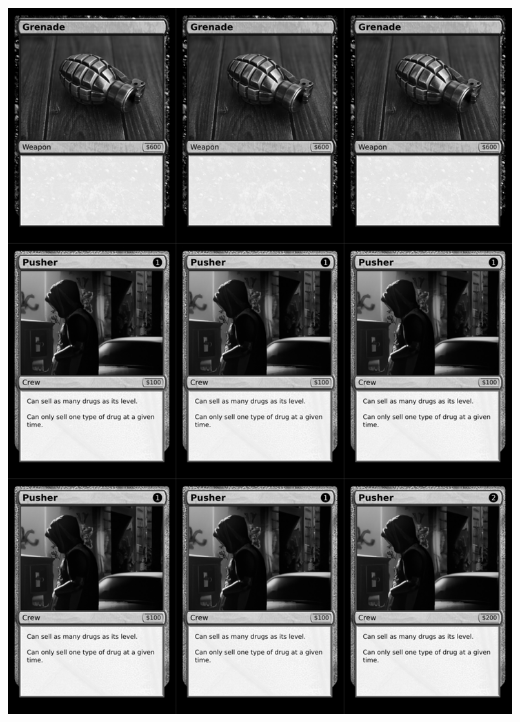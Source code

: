 \documentclass[a4paper]{article}
\begin{document}
\newpage

\begin{center}
	\centering
	\includegraphics[width=200.5mm,height=280.7mm]{output/temp/page9.png}
\end{center}
\end{document}
